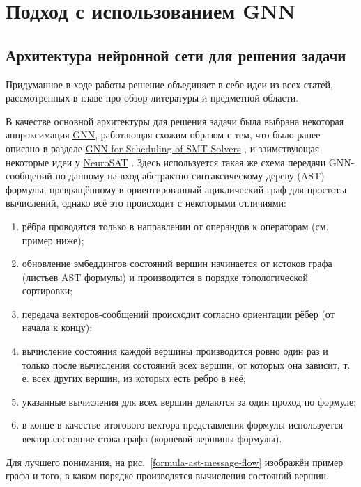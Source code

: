 \section{Подход с использованием GNN}

\subsection{Архитектура нейронной сети для решения задачи}

Придуманное в ходе работы решение объединяет в себе идеи из всех статей, рассмотренных в главе про обзор литературы и предметной области.

В качестве основной архитектуры для решения задачи была выбрана некоторая аппроксимация \underline{\hyperref[gnn-architecture]{GNN}}, работающая схожим образом с тем, что было ранее описано в разделе \underline{\hyperref[gnn-for-scheduling-of-smt-solvers]{GNN for Scheduling of SMT Solvers}} \cite{gnn-for-scheduling-paper}, и заимствующая некоторые идеи у \underline{\hyperref[neurosat]{NeuroSAT}} \cite{neurosat-paper}. Здесь используется такая же схема передачи GNN-сообщений по данному на вход абстрактно-синтаксическому дереву (AST) формулы, превращённому в ориентированный ациклический граф для простоты вычислений, однако всё это происходит с некоторыми отличиями:

\begin{enumerate}
    \item рёбра проводятся только в направлении от операндов к операторам (см. пример ниже);
    \item обновление эмбеддингов состояний вершин начинается от истоков графа (листьев AST формулы) и производится в порядке топологической сортировки;
    \item передача векторов-сообщений происходит согласно ориентации рёбер (от начала к концу);
    \item вычисление состояния каждой вершины производится ровно один раз и только после вычисления состояний всех вершин, от которых она зависит, т. е. всех других вершин, из которых есть ребро в неё;
    \item указанные вычисления для всех вершин делаются за один проход по формуле;
    \item в конце в качестве итогового вектора-представления формулы используется вектор-состояние стока графа (корневой вершины формулы).
\end{enumerate}

Для лучшего понимания, на рис.~\ref{formula-ast-message-flow} изображён пример графа и того, в каком порядке производятся вычисления состояний вершин.

